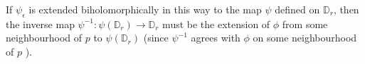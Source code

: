If $\psi_{\epsilon}$ is extended biholomorphically in this way to the map $\psi$ defined on $\mathbb{D}_{r}$, then the inverse map $\psi^{-1}: \psi\left(\mathbb{D}_{r}\right) \rightarrow \mathbb{D}_{r}$ must be the extension of $\phi$ from some neighbourhood of $p$ to $\psi\left(\mathbb{D}_{r}\right)$ (since $\psi^{-1}$ agrees with $\phi$ on some neighbourhood of $p$ ).

